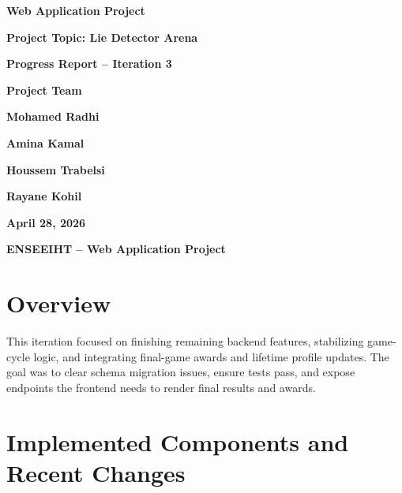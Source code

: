 \documentclass[11pt,a4paper]{article}
\begin{document}
\begin{titlepage}
    \centering
    \vspace*{1.5cm}

    {\Large \textbf{Web Application Project}\par}
    \vspace{0.3cm}
    {\Large \textbf{Project Topic: Lie Detector Arena}\par}
    \vspace{0.6cm}
    {\large \textbf{Progress Report -- Iteration 3}\par}

     \vspace{2.8cm}

    {\large \textbf{Project Team}\par}
     \vspace{0.5cm}

    {\Large \textbf{Mohamed Radhi}\par
     \vspace{0.15cm}
     \textbf{Amina Kamal}\par
     \vspace{0.15cm}
     \textbf{Houssem Trabelsi}\par
     \vspace{0.15cm}
     \textbf{Rayane Kohil}\par}

     \vspace{2.8cm}

    {\large \textbf{April 28, 2026}\par}

    \vfill

    {\large \textbf{ENSEEIHT -- Web Application Project}\par}
\end{titlepage}

\section{Overview}

This iteration focused on finishing remaining backend features, stabilizing game-cycle logic, and integrating final-game awards and lifetime profile updates. The goal was to clear schema migration issues, ensure tests pass, and expose endpoints the frontend needs to render final results and awards.

\section{Implemented Components and Recent Changes}
\end{document}
